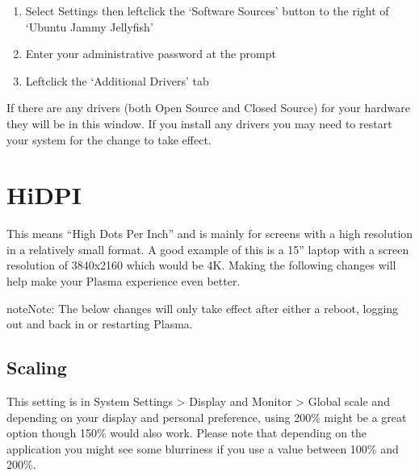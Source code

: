 \documentclass[letterpaper,10pt,english]{sphinxmanual}
\begin{document}
\begin{enumerate}
%
\setcounter{enumi}{1}
\item {} 
\sphinxAtStartPar
Select Settings then left\sphinxhyphen{}click the ‘Software Sources’ button to the right of ‘Ubuntu Jammy Jellyfish’

\item {} 
\sphinxAtStartPar
Enter your administrative password at the prompt

\item {} 
\sphinxAtStartPar
Left\sphinxhyphen{}click the ‘Additional Drivers’ tab

\end{enumerate}


\sphinxAtStartPar
If there are any drivers (both Open Source and Closed Source) for your hardware they will be in this window. If you install any drivers you may need to restart your system for the change to take effect.


\section{HiDPI}
\label{\detokenize{docs/desktop-guide/hidpi:hidpi}}\label{\detokenize{docs/desktop-guide/hidpi:hidpi-link}}\label{\detokenize{docs/desktop-guide/hidpi::doc}}
\sphinxAtStartPar
This means “High Dots Per Inch” and is mainly for screens with a high resolution in a relatively small format. A good example of this is a 15” laptop with a screen resolution of 3840x2160 which would be 4K. Making the following changes will help make your Plasma experience even better.

\begin{sphinxadmonition}{note}{Note:}
\sphinxAtStartPar
The below changes will only take effect after either a reboot, logging out and back in or restarting Plasma.
\end{sphinxadmonition}


\subsection{Scaling}
\label{\detokenize{docs/desktop-guide/hidpi:scaling}}
\sphinxAtStartPar
This setting is in System Settings \sphinxhyphen{}\textgreater{} Display and Monitor \sphinxhyphen{}\textgreater{} Global scale and depending on your display and personal preference, using 200\% might be a great option though 150\% would also work. Please note that depending on the application you might see some blurriness if you use a value between 100\% and 200\%.
\end{document}
